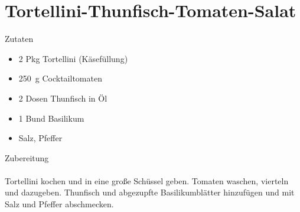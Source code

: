 \section*{Tortellini-Thunfisch-Tomaten-Salat}
\ihead{}\ohead{}
\cfoot{}
{\Large Zutaten}
\begin{multicols}{2}
\begin{itemize}
    \item \num{2} Pkg Tortellini (Käsefüllung)
    \item \SI{250}{g} Cocktailtomaten 
    \item \num{2} Dosen Thunfisch in Öl
    \item \num{1} Bund Basilikum
    \item Salz, Pfeffer
\end{itemize}
\end{multicols}
\noindent
{\Large Zubereitung}\\
\\
Tortellini kochen und in eine große Schüssel geben. 
Tomaten waschen, vierteln und dazugeben.
Thunfisch und abgezupfte Basilikumblätter hinzufügen und mit Salz und Pfeffer abschmecken.